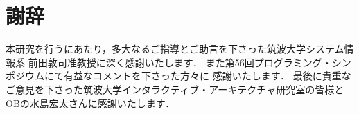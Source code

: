 \documentclass[a4paper,11pt,dvipdfmx]{jreport}
\makeatletter
\renewenvironment{thebibliography}[1]%
{\chapter*{\bibname\@mkboth{\bibname}{\bibname}}%
	\addcontentsline{toc}{chapter}{\numberline{}\bibname}%
	\list{\@biblabel{\@arabic\c@enumiv}}%
	{\settowidth\labelwidth{\@biblabel{#1}}%
		\leftmargin\labelwidth
		\advance\leftmargin\labelsep
		\@openbib@code
		\usecounter{enumiv}%
		\let\p@enumiv\@empty
		\renewcommand\theenumiv{\@arabic\c@enumiv}}%
	\sloppy
	\clubpenalty4000
	\@clubpenalty\clubpenalty
	\widowpenalty4000%
	\sfcode`\.\@m}
{\def\@noitemerr
	{\@latex@warning{Empty `thebibliography' environment}}%
	\endlist}
\makeatother
\begin{document}
\chapter*{謝辞}

本研究を行うにあたり，多大なるご指導とご助言を下さった筑波大学システム情報系
前田敦司准教授に深く感謝いたします．
また第56回プログラミング・シンポジウムにて有益なコメントを下さった方々に
感謝いたします．
最後に貴重なご意見を下さった筑波大学インタラクティブ・アーキテクチャ研究室の皆様と
OBの水島宏太さんに感謝いたします．

\newpage

\nocite{Java}
\nocite{ContextJ}
\nocite{C3Linearization}
\nocite{CISCO}
\nocite{OptimizingMessageSends}
\nocite{MethodCachingForRuby}
\nocite{ShiftResetTutorial}
\nocite{ShiftResetOnMinCaml}
\nocite{ExnAndDelimCont}
\renewcommand{\bibname}{参考文献}




%
%
\end{document}
